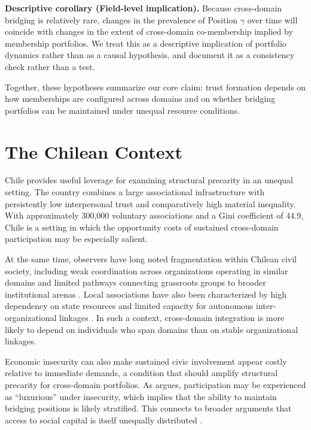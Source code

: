 \textbf{Descriptive corollary (Field-level implication).} Because cross-domain bridging is relatively rare, changes in the prevalence of Position $\gamma$ over time will coincide with changes in the extent of cross-domain co-membership implied by membership portfolios. We treat this as a descriptive implication of portfolio dynamics rather than as a causal hypothesis, and document it as a consistency check rather than a test.


Together, these hypotheses summarize our core claim: trust formation depends on how memberships are configured across domains and on whether bridging portfolios can be maintained under unequal resource conditions.

\section{The Chilean Context}

Chile provides useful leverage for examining structural precarity in an unequal setting. The country combines a large associational infrastructure with persistently low interpersonal trust and comparatively high material inequality. With approximately 300{,}000 voluntary associations \parencite{irarrazaval_chile_2017} and a Gini coefficient of 44.9, Chile is a setting in which the opportunity costs of sustained cross-domain participation may be especially salient.

At the same time, observers have long noted fragmentation within Chilean civil society, including weak coordination across organizations operating in similar domains and limited pathways connecting grassroots groups to broader institutional arenas \parencite{programa_de_las_naciones_unidas_para_el_desarrollo_desarrollo_2000, delamaza_construccion_2010}. Local associations have also been characterized by high dependency on state resources and limited capacity for autonomous inter-organizational linkages \parencite{espinoza_local_2013}. In such a context, cross-domain integration is more likely to depend on individuals who span domains than on stable organizational linkages.

Economic insecurity can also make sustained civic involvement appear costly relative to immediate demands, a condition that should amplify structural precarity for cross-domain portfolios. As \textcite{oxhorn_neopluralism_2004} argues, participation may be experienced as ``luxurious'' under insecurity, which implies that the ability to maintain bridging positions is likely stratified. This connects to broader arguments that access to social capital is itself unequally distributed \parencite{portes_social_1998}.

